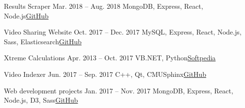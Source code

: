     \ifwebdev
    \resumeSubheading
      {Results Scraper \javascript}{Mar. 2018 -- Aug. 2018}
      {MongoDB, Express, React, Node.js}{\href{https://github.com/yrahul3910/results-scraper-node}{GitHub}}
    \fi
      
    \ifwebdev
    \resumeSubheading
      {Video Sharing Website \javascript}{Oct. 2017 -- Dec. 2017}
      {MySQL, Express, React, Node.js, Sass, Elasticsearch}{\href{https://github.com/yrahul3910/video-sharing-site}{GitHub}}
    \fi
      
    \ifdesktop
    \resumeSubheading
      {Xtreme Calculations \vbnet}{Apr. 2013 -- Oct. 2017}
      {VB.NET, Python}{\href{https://www.softpedia.com/get/Science-CAD/Xtreme-Calculations.shtml}{Softpedia}}
    \fi
      
    \ifdesktop
    \resumeSubheading
      {Video Indexer \cpp}{Jun. 2017 -- Sep. 2017}
      {C++, Qt, CMUSphinx}{\href{https://github.com/yrahul3910/video-indexer}{GitHub}}
    \fi
      
    \ifwebdev
    \resumeSubheading
      {Web development projects \javascript}{Jan. 2017 -- Nov. 2017}
      {MongoDB, Express, React, Node.js, D3, Sass}{\href{https://github.com/yrahul3910/video-indexer}{GitHub}}
    \fi
  \resumeSubHeadingListEnd